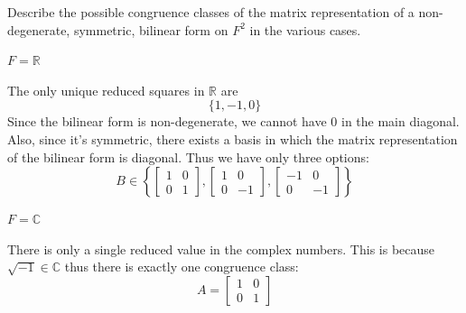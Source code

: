 \documentclass[11pt]{article}
\newcommand{\C}{\mathbb{C}}
\newcommand{\R}{\mathbb{R}}
\begin{document}
\newpage
\begin{problem}
  Describe the possible congruence classes of the matrix representation of a
  non-degenerate, symmetric, bilinear form on $F^2$ in the various cases.
  \begin{parts}

  \item $F = \mathbb{R}$
    \begin{solution}
      The only unique reduced squares in \( \R \) are
      \[
        \{1,-1, 0\}
      \]
      Since the bilinear form is non-degenerate, we cannot have \( 0
      \) in the main diagonal. Also, since it's symmetric, there
      exists a basis in which the matrix representation of the
      bilinear form is diagonal. Thus we have only three options:
      \[
        B\in\left\{
          \begin{bmatrix}
            1 & 0 \\
            0 & 1
          \end{bmatrix},
          \begin{bmatrix}
            1 & 0 \\
            0 & -1
          \end{bmatrix},
          \begin{bmatrix}
            -1 & 0 \\
            0 & -1
          \end{bmatrix}
        \right\}
      \]
    \end{solution}
    \newpage
  \item $F = \mathbb{C}$
    \begin{solution}
      There is only a single reduced value in the complex numbers.
      This is because \( \sqrt{-1}\in\C \) thus there is exactly one
      congruence class:
      \[
        A=
        \begin{bmatrix}
          1 & 0 \\
          0 & 1
        \end{bmatrix}
      \]
    \end{solution}


\end{parts}
\end{problem}
\end{document}
